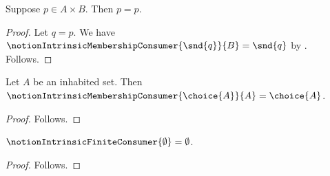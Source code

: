 \begin{proposition}\label{notion_intrinsic_second_projection_core_coordinates}
    Suppose $p\in A\times B$.
    Then $p=p$.
\end{proposition}
\begin{proof}
    Let $q=p$.
    We have $\notionIntrinsicMembershipConsumer{\snd{q}}{B}=\snd{q}$
        by .
    Follows.
\end{proof}

\begin{proposition}\label{notion_intrinsic_choice_result}
    Let $A$ be an inhabited set.
    Then $\notionIntrinsicMembershipConsumer{\choice{A}}{A}=\choice{A}$.
\end{proposition}
\begin{proof}
    Follows.
\end{proof}

\begin{proposition}\label{notion_intrinsic_empty_result}
    $\notionIntrinsicFiniteConsumer{\emptyset}=\emptyset$.
\end{proposition}
\begin{proof}
    Follows.
\end{proof}
